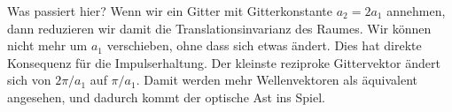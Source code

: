 Was passiert hier? Wenn wir ein Gitter mit Gitterkonstante $a_2 = 2 a_1$ annehmen, dann reduzieren wir damit die Translationsinvarianz des Raumes. Wir können nicht mehr um $a_1$ verschieben, ohne dass sich etwas ändert. Dies hat direkte Konsequenz für die Impulserhaltung. Der kleinste reziproke Gittervektor ändert sich von $2 \pi / a_1$ auf $ \pi / a_1$. Damit werden mehr Wellenvektoren als äquivalent angesehen, und dadurch kommt der optische Ast ins Spiel.








